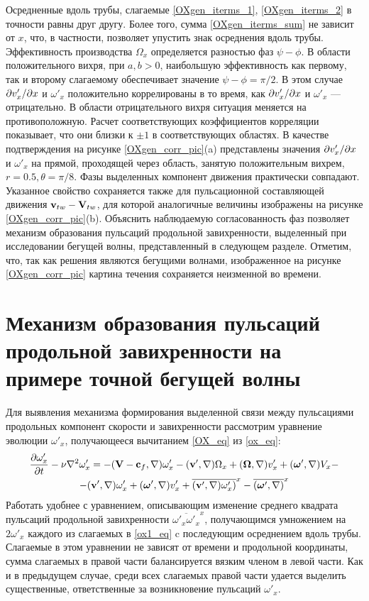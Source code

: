 Осредненные вдоль трубы, слагаемые \eqref{OXgen_iterms_1}, \eqref{OXgen_iterms_2} в точности равны друг другу. Более того, сумма \eqref{OXgen_iterms_sum} не зависит от $x$, что, в частности, позволяет упустить знак осреднения вдоль трубы. Эффективность производства  $\Omega_x$ определяется разностью фаз $\psi - \phi$. В области положительного вихря, при $a,b > 0$, наибольшую эффективность как первому, так и второму слагаемому обеспечивает значение $\psi - \phi = \pi/2$. В этом случае $\partial v'_x/\partial x$ и $\omega'_x$ положительно коррелированы в то время, как $\partial v'_x/\partial x$ и $\omega'_x$ --- отрицательно. В области отрицательного вихря ситуация меняется на противоположную. Расчет соответствующих коэффициентов корреляции показывает, что они близки к $\pm1$ в соответствующих областях. В качестве подтверждения на рисунке \ref{OXgen_corr_pic}(a) представлены значения $\partial v'_x/\partial x$ и $\omega'_x$ на прямой, проходящей через область, занятую положительным вихрем, $r = 0.5, \theta = \pi/8$. Фазы выделенных компонент движения практически совпадают. Указанное свойство сохраняется также для пульсационной составляющей движения $\mathbf{v}_{tw} - \mathbf{V}_{tw}$, для которой аналогичные величины изображены на рисунке \ref{OXgen_corr_pic}(b). Объяснить наблюдаемую согласованность фаз позволяет механизм образования пульсаций продольной завихренности, выделенный при исследовании бегущей волны, представленный в следующем разделе. Отметим, что, так как решения являются бегущими волнами, изображенное на рисунке \ref{OXgen_corr_pic} картина течения сохраняется неизменной во времени. 


\section{Механизм образования пульсаций продольной завихренности на примере точной бегущей волны}

Для выявления механизма формирования выделенной связи между пульсациями продольных компонент скорости и завихренности рассмотрим уравнение эволюции $\omega'_x$, получающееся вычитанием \eqref{OX_eq} из \eqref{ox_eq}:
\begin{multline}\label{ox1_eq}
\frac{\partial \omega'_x}{\partial t} - \nu \nabla^2 \omega'_x = - (\mathbf{V} - \mathbf{c}_f, \nabla) \omega'_x - (\mathbf{v}', \nabla) \Omega_x
+(\mbox{\boldmath$\Omega$}, \nabla) v'_x + (\mbox{\boldmath$\omega$}', \nabla) V_x -\\- (\mathbf{v}', \nabla) \omega'_x  + (\mbox{\boldmath$\omega$}', \nabla) v'_x  + \overline{(\mathbf{v}', \nabla) \omega'_x)}^x  - \overline{(\mbox{\boldmath$\omega$}', \nabla)}^x
\end{multline}
Работать удобнее с уравнением, описывающим изменение среднего квадрата пульсаций продольной завихренности $\overline{\omega'_x\omega'_x}^x$, получающимся умножением на~$2\omega'_x$ каждого из слагаемых в \eqref{ox1_eq} c последующим осреднением вдоль трубы. Слагаемые в этом уравнении не зависят от времени и продольной координаты, сумма слагаемых в правой части балансируется вязким членом в левой части. Как и в предыдущем случае, среди всех слагаемых правой части удается выделить существенные, ответственные за возникновение пульсаций $\omega'_x$.


